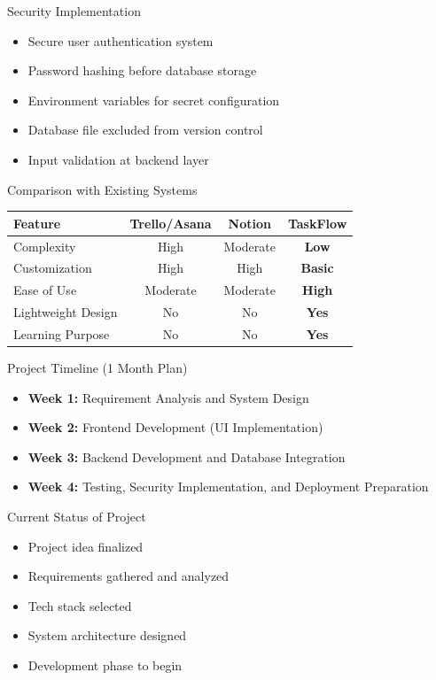 \documentclass{beamer}
\begin{document}
\begin{frame}{Security Implementation}
\begin{itemize}
    \item Secure user authentication system
    \item Password hashing before database storage
    \item Environment variables for secret configuration
    \item Database file excluded from version control
    \item Input validation at backend layer
\end{itemize}
\end{frame}

\begin{frame}{Comparison with Existing Systems}
\centering
\begin{tabular}{lccc}
\toprule
Feature & Trello/Asana & Notion & \textbf{TaskFlow} \\
\midrule
Complexity & High & Moderate & \textbf{Low} \\
Customization & High & High & \textbf{Basic} \\
Ease of Use & Moderate & Moderate & \textbf{High} \\
Lightweight Design & No & No & \textbf{Yes} \\
Learning Purpose & No & No & \textbf{Yes} \\
\bottomrule
\end{tabular}
\end{frame}

\begin{frame}{Project Timeline (1 Month Plan)}
\begin{itemize}
    \item \textbf{Week 1:} Requirement Analysis and System Design
    \item \textbf{Week 2:} Frontend Development (UI Implementation)
    \item \textbf{Week 3:} Backend Development and Database Integration
    \item \textbf{Week 4:} Testing, Security Implementation, and Deployment Preparation
\end{itemize}
\end{frame}

\begin{frame}{Current Status of Project}
\begin{itemize}
    \item Project idea finalized
    \item Requirements gathered and analyzed
    \item Tech stack selected
    \item System architecture designed
    \item Development phase to begin
\end{itemize}
\end{frame}
\end{document}
